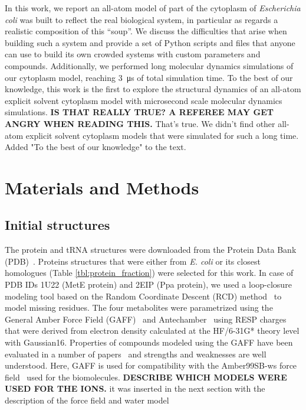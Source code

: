 \documentclass[journal=jcisd8,manuscript=article]{achemso}
\begin{document}
In this work, we report an all-atom model of part of the cytoplasm of
\textit{Escherichia coli} was built to reflect the real biological
system, in particular as regards a realistic composition of this
``soup''. We discuss the difficulties that arise when building such a
system and provide a set of Python scripts and files that anyone can
use to build its own crowded systems with custom parameters and
compounds. Additionally, we performed long molecular dynamics
simulations of our cytoplasm model, reaching \SI{3}{\micro\second} of
total simulation time. {\color{blue}To the best of our knowledge,} this work is the first to explore the
structural dynamics of an all-atom explicit solvent cytoplasm model 
with microsecond scale molecular dynamics simulations. {\bf IS THAT
  REALLY TRUE? A REFEREE MAY GET ANGRY WHEN READING THIS.} {\color{blue} That's true. We didn't find other all-atom explicit solvent cytoplasm models that were simulated for such a long time. Added "To the best of our knowledge" to the text.}



\section*{Materials and Methods}

\subsection{Initial structures}
The protein and tRNA structures were downloaded from the Protein Data
Bank (PDB)~\cite{pdb}. Proteins structures that were either from {\em
  E. coli} or its closest homologues (Table
\ref{tbl:protein_fraction}) were selected for this work. In case of
PDB IDs 1U22 (MetE protein) and 2EIP (Ppa protein), we used a
loop-closure modeling tool based on the Random Coordinate Descent
(RCD) method~\cite{Chys2013} to model missing residues. The four
metabolites were parametrized using the General Amber Force Field
(GAFF)~\cite{Wang2004a} and Antechamber~\cite{Wang2005b} using RESP
charges~\cite{Bayly1993a} that were derived from electron density
calculated at the HF/6-31G* theory level with Gaussian16.  Properties
of compounds modeled using the GAFF have been evaluated in a number of
papers~\cite{Caleman2012a,sprenger2015general,Fischer2015a,JZhang2015a,JZhang2015,Spoel2018a}
and strengths and weaknesses are well understood. Here, GAFF is used
for compatibility with the Amber99SB-ws force field~\cite{Best2014a}
used for the biomolecules. {\bf DESCRIBE WHICH MODELS WERE USED FOR
  THE IONS.} {\color{blue} it was inserted in the next section with the description of the force field and water model}
 
\end{document}
